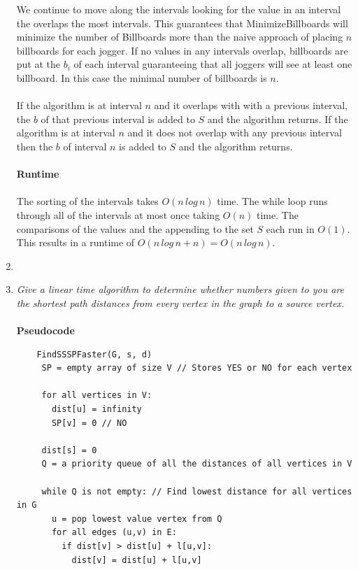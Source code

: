 \documentclass[12pt]{article}
\begin{document}
\begin{enumerate}
			We continue to move along the intervals looking for the value in an interval the overlaps the most intervals.  
			This guarantees that MinimizeBillboards will minimize the number of Billboards more than the naive approach of placing $n$ billboards for each jogger.
			If no values in any intervals overlap, billboards are put at the $b_i$ of each interval guaranteeing that all joggers will see at least one billboard.  
			In this case the minimal number of billboards is $n$.\\
			\\
			If the algorithm is at interval $n$ and it overlaps with with a previous interval, the $b$ of that previous interval is added to $S$ and the algorithm returns.
			If the algorithm is at interval $n$ and it does not overlap with any previous interval then the $b$ of interval $n$ is added to $S$ and the algorithm returns.\\
			\\
			\textbf{Runtime}\\
			\\
			The sorting of the intervals takes $O(n\,log\,n)$ time.  The while loop runs through all of the intervals at most once taking $O(n)$ time.  
			The comparisons of the values and the appending to the set $S$ each run in $O(1)$.  This results in a runtime of $O(n\,log\,n+n) = O(n\,log\,n)$.
	\newpage
	\item
	\newpage
	\item \textit{Give a linear time algorithm to determine whether numbers given to you are the shortest path distances from every vertex in the graph to a source vertex.}\\
	\\
	\textbf{Pseudocode}
	\begin{verbatim}
	FindSSSPFaster(G, s, d)
	 SP = empty array of size V // Stores YES or NO for each vertex
	 
	 for all vertices in V:
	   dist[u] = infinity
	   SP[v] = 0 // NO
	   
	 dist[s] = 0
	 Q = a priority queue of all the distances of all vertices in V
	 
	 while Q is not empty: // Find lowest distance for all vertices in G
	   u = pop lowest value vertex from Q
	   for all edges (u,v) in E:
	     if dist[v] > dist[u] + l[u,v]:
	       dist[v] = dist[u] + l[u,v]
	       

\end{verbatim}
\end{enumerate}
\end{document}

